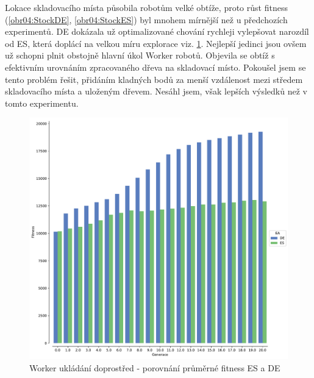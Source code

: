    	Lokace skladovacího místa působila robotům velké obtíže, proto růst fitness (\ref{obr04:StockDE}, \ref{obr04:StockES}) byl mnohem mírnější než u předchozích experimentů. DE dokázala už optimalizované chování rychleji vylepšovat narozdíl od ES, která doplácí na velkou míru explorace viz. \ref{obr04:StockESvsDE}. Nejlepší jedinci jsou ovšem už schopni plnit obstojně hlavní úkol Worker robotů. Objevila se obtíž s efektivním urovnáním zpracovaného dřeva na skladovací místo. Pokoušel jsem se tento problém řešit, přidáním kladných bodů za menší vzdálenost mezi středem skladovacího místa a uloženým dřevem. Nesáhl jsem, však lepších výsledků než v tomto experimentu. 
	\begin{figure}[t]\centering
		\includegraphics[width=\columnwidth]{../img/WoodMap/DEvsES/WorkerStockMem}
		\caption{Worker ukládání doprostřed  - porovnání průměrné fitness ES a DE}
		\label{obr04:StockESvsDE}
	\end{figure}
